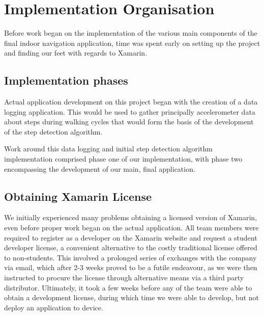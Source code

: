\documentclass[12pt,a4paper]{report}
\begin{document}
\section{Implementation Organisation}
Before work began on the implementation of the various main components of the final indoor navigation application, time was spent early on setting up the project and finding our feet with regards to Xamarin.

\subsection{Implementation phases}

Actual application development on this project began with the creation of a data logging application. This would be used to gather principally accelerometer data about steps during walking cycles that would form the basis of the development of the step detection algorithm.

Work around this data logging and initial step detection algorithm implementation comprised phase one of our implementation, with phase two encompassing the development of our main, final application.

\subsection{Obtaining Xamarin License}

We initially experienced many problems obtaining a licensed version of Xamarin, even before proper work began on the actual application. All team members were required to register as a developer on the Xamarin website and request a student developer license, a convenient alternative to the costly traditional license offered to non-students. This involved a prolonged series of exchanges with the company via email, which after 2-3 weeks proved to be a futile endeavour, as we were then instructed to procure the license through alternative means via a third party distributor. Ultimately, it took a few weeks before any of the team were able to obtain a development license, during which time we were able to develop, but not deploy an application to device. 
\end{document}
